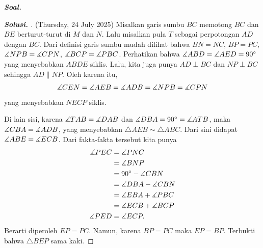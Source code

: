 \textbf{\textit{Soal.}} 

\begin{proof}[\textbf{Solusi. }] (Thursday, 24 July 2025) 
    Misalkan garis sumbu $BC$ memotong $BC$ dan $BE$ berturut-turut di $M$ dan $N$. Lalu misalkan pula $T$ sebagai perpotongan $AD$ dengan $BC$.
    Dari definisi garis sumbu mudah dilihat bahwa $BN=NC$, $BP=PC$, $\measuredangle NPB = \measuredangle CPN$,  $\measuredangle BCP = \measuredangle PBC$. 
    Perhatikan bahwa $\measuredangle ABD = \measuredangle AED = 90^\circ$ yang menyebabkan $ABDE$ siklis.
    Lalu, kita juga punya $AD \perp BC$ dan $NP \perp BC$ sehingga $AD \parallel NP$.
    Oleh karena itu, 
    \begin{align*}
        \measuredangle CEN = \measuredangle AEB = \measuredangle ADB = \measuredangle NPB = \measuredangle CPN
    \end{align*}
    yang menyebabkan $NECP$ siklis.
    
    Di lain sisi, karena $\measuredangle TAB = \measuredangle DAB$ dan $\measuredangle DBA = 90^\circ = \measuredangle ATB$, maka $\measuredangle CBA = \measuredangle ADB$, yang menyebabkan $\triangle AEB \sim \triangle ABC$.
    Dari sini didapat $\measuredangle ABE = \measuredangle ECB$. 
    Dari fakta-fakta tersebut kita punya
    \begin{align*}
        \measuredangle PEC
        &= \measuredangle PNC \\
        &= \measuredangle BNP \\
        &= 90^\circ - \measuredangle CBN \\
        &= \measuredangle DBA - \measuredangle CBN \\
        &= \measuredangle EBA + \measuredangle PBC \\
        &= \measuredangle ECB + \measuredangle BCP \\
        \measuredangle PED &= \measuredangle ECP.
    \end{align*}
    Berarti diperoleh $EP=PC$. Namun, karena $BP=PC$ maka $EP=BP$. Terbukti bahwa $\triangle BEP$ sama kaki.
\end{proof}